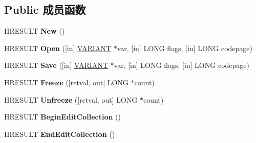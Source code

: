 \subsection*{Public 成员函数}
\begin{DoxyCompactItemize}
\item 
\mbox{\label{interfacetom_1_1_i_text_document_a8efffa712cb00b80204ebf564db76ec1}} 
H\+R\+E\+S\+U\+LT {\bfseries New} ()
\item 
\mbox{\label{interfacetom_1_1_i_text_document_a63deed928de09f9103fc54cc104b54a8}} 
H\+R\+E\+S\+U\+LT {\bfseries Open} (\mbox{[}in\mbox{]} \hyperlink{structtag_v_a_r_i_a_n_t}{V\+A\+R\+I\+A\+NT} $\ast$var, \mbox{[}in\mbox{]} L\+O\+NG flags, \mbox{[}in\mbox{]} L\+O\+NG codepage)
\item 
\mbox{\label{interfacetom_1_1_i_text_document_ac6c42ba4d63cd283b14f3bbbd700babc}} 
H\+R\+E\+S\+U\+LT {\bfseries Save} (\mbox{[}in\mbox{]} \hyperlink{structtag_v_a_r_i_a_n_t}{V\+A\+R\+I\+A\+NT} $\ast$var, \mbox{[}in\mbox{]} L\+O\+NG flags, \mbox{[}in\mbox{]} L\+O\+NG codepage)
\item 
\mbox{\label{interfacetom_1_1_i_text_document_a01792659527fffe2d515757f31dab505}} 
H\+R\+E\+S\+U\+LT {\bfseries Freeze} (\mbox{[}retval, out\mbox{]} L\+O\+NG $\ast$count)
\item 
\mbox{\label{interfacetom_1_1_i_text_document_a683eeed755af0c1604f4eb6b65073eaa}} 
H\+R\+E\+S\+U\+LT {\bfseries Unfreeze} (\mbox{[}retval, out\mbox{]} L\+O\+NG $\ast$count)
\item 
\mbox{\label{interfacetom_1_1_i_text_document_a9d2edb66cae802734f2a583cf9670ffd}} 
H\+R\+E\+S\+U\+LT {\bfseries Begin\+Edit\+Collection} ()
\item 
\mbox{\label{interfacetom_1_1_i_text_document_a62e404831bc37be03eafd921fa6b28a0}} 
H\+R\+E\+S\+U\+LT {\bfseries End\+Edit\+Collection} ()
\item 
\mbox{\label{interfacetom_1_1_i_text_document_ae55f32b722a84a5cf1ec9eec6a2bc12b}} 

\end{DoxyCompactItemize}
